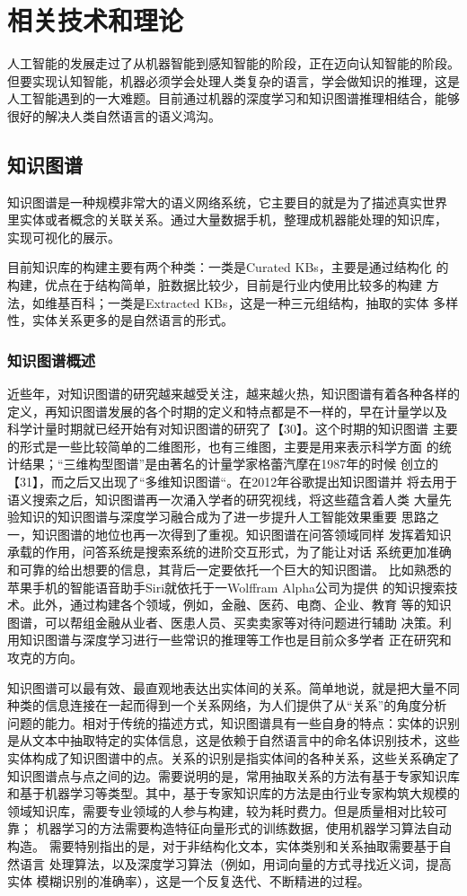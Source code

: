 \documentclass{standalone}
\begin{document}
\chapter{相关技术和理论}
人工智能的发展走过了从机器智能到感知智能的阶段，正在迈向认知智能的阶段。
但要实现认知智能，机器必须学会处理人类复杂的语言，学会做知识的推理，这是
人工智能遇到的一大难题。目前通过机器的深度学习和知识图谱推理相结合，能够
很好的解决人类自然语言的语义鸿沟。
\section{知识图谱}
知识图谱是一种规模非常大的语义网络系统，它主要目的就是为了描述真实世界
里实体或者概念的关联关系。通过大量数据手机，整理成机器能处理的知识库，
实现可视化的展示。

目前知识库的构建主要有两个种类：一类是Curated KBs，主要是通过结构化
的构建，优点在于结构简单，脏数据比较少，目前是行业内使用比较多的构建
方法，如维基百科；一类是Extracted KBs，这是一种三元组结构，抽取的实体
多样性，实体关系更多的是自然语言的形式。
\subsection{知识图谱概述}
近些年，对知识图谱的研究越来越受关注，越来越火热，知识图谱有着各种各样的
定义，再知识图谱发展的各个时期的定义和特点都是不一样的，早在计量学以及
科学计量时期就已经开始有对知识图谱的研究了【30】。这个时期的知识图谱
主要的形式是一些比较简单的二维图形，也有三维图，主要是用来表示科学方面
的统计结果；“三维构型图谱”是由著名的计量学家格蕾汽摩在1987年的时候
创立的【31】，而之后又出现了“多维知识图谱“。在2012年谷歌提出知识图谱并
将去用于语义搜索之后，知识图谱再一次涌入学者的研究视线，将这些蕴含着人类
大量先验知识的知识图谱与深度学习融合成为了进一步提升人工智能效果重要
思路之一，知识图谱的地位也再一次得到了重视。知识图谱在问答领域同样
发挥着知识承载的作用，问答系统是搜索系统的进阶交互形式，为了能让对话
系统更加准确和可靠的给出想要的信息，其背后一定要依托一个巨大的知识图谱。
比如熟悉的苹果手机的智能语音助手Siri就依托于一Wolffram Alpha公司为提供
的知识搜索技术。此外，通过构建各个领域，例如，金融、医药、电商、企业、教育
等的知识图谱，可以帮组金融从业者、医患人员、买卖卖家等对待问题进行辅助
决策。利用知识图谱与深度学习进行一些常识的推理等工作也是目前众多学者
正在研究和攻克的方向。

知识图谱可以最有效、最直观地表达出实体间的关系。简单地说，就是把大量不同
种类的信息连接在一起而得到一个关系网络，为人们提供了从“关系”的角度分析
问题的能力。相对于传统的描述方式，知识图谱具有一些自身的特点：实体的识别
是从文本中抽取特定的实体信息，这是依赖于自然语言中的命名体识别技术，这些
实体构成了知识图谱中的点。关系的识别是指实体间的各种关系，这些关系确定了
知识图谱点与点之间的边。需要说明的是，常用抽取关系的方法有基于专家知识库
和基于机器学习等类型。其中，基于专家知识库的方法是由行业专家构筑大规模的
领域知识库，需要专业领域的人参与构建，较为耗时费力。但是质量相对比较可靠；
机器学习的方法需要构造特征向量形式的训练数据，使用机器学习算法自动构造。
需要特别指出的是，对于非结构化文本，实体类别和关系抽取需要基于自然语言
处理算法，以及深度学习算法（例如，用词向量的方式寻找近义词，提高实体
模糊识别的准确率），这是一个反复迭代、不断精进的过程。
\end{document}
